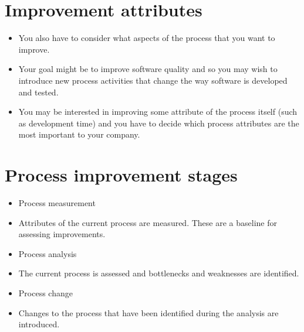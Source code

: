 \section{Improvement attributes}
\begin{itemize}

\item You also have to consider what aspects of the process that you want to improve.

\item Your goal might be to improve software quality and so you may wish to introduce new process activities that change the way software is developed and tested.

\item You may be interested in improving some attribute of the process itself (such as development time) and you have to decide which process attributes are the most important to your company.
\end{itemize}

\section{Process improvement stages}
\begin{itemize}


\item Process measurement

   \item Attributes of the current process are measured. These are a baseline for assessing improvements.

\item Process analysis

   \item The current process is assessed and bottlenecks and weaknesses are identified.

\item Process change

   \item Changes to the process that have been identified during the analysis are introduced.


\end{itemize}

